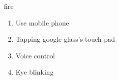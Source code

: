 fire
\begin{enumerate}
\item Use mobile phone
\item Tapping google glass's touch pad
\item Voice control
\item Eye blinking
\end{enumerate}

